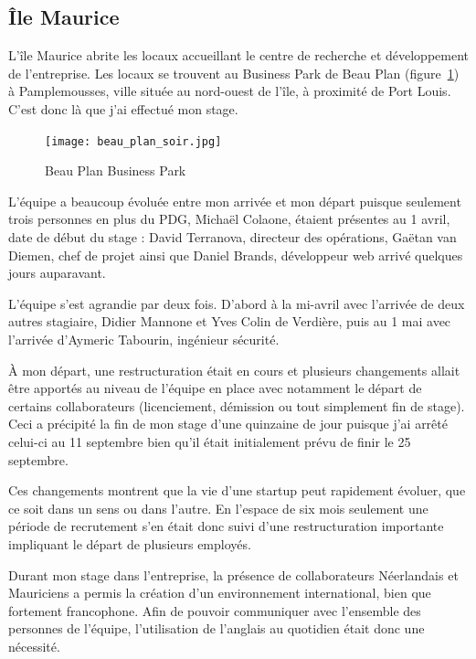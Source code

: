 \documentclass[a4paper,10pt, twoside]{report}
\begin{document}
\begin{spacing}{1.2}
\section{\^Ile Maurice}
L'\^ile Maurice abrite les locaux accueillant le centre de recherche et
d\'eveloppement de l'entreprise. Les locaux se trouvent au Business Park de
Beau Plan (figure~\ref{beauPlan}) \`a Pamplemousses, ville situ\'ee au
nord-ouest de l'\^ile, \`a proximit\'e de Port Louis. C'est donc l\`a que
j'ai effectu\'e mon stage.

\begin{figure}[h!]
  \centering
  \texttt{[image: beau\_plan\_soir.jpg]}
  \caption{\label{beauPlan} Beau Plan Business Park}
\end{figure}

L'\'equipe a beaucoup \'evolu\'ee entre mon arriv\'ee et mon d\'epart puisque
seulement trois personnes en plus du PDG, Micha\"el Colaone, \'etaient
pr\'esentes au 1 avril, date de d\'ebut du stage : David Terranova,
directeur des op\'erations, Ga\"etan van Diemen, chef de projet ainsi que
Daniel Brands, d\'eveloppeur web arriv\'e quelques jours auparavant.

L'\'equipe s'est agrandie par deux fois. D'abord \`a la mi-avril avec
l'arriv\'ee de deux autres stagiaire, Didier Mannone et
Yves Colin de Verdi\`ere, puis au 1 mai avec l'arriv\'ee d'Aymeric
Tabourin, ing\'enieur s\'ecurit\'e.

\`A mon d\'epart, une restructuration \'etait en cours et plusieurs changements
allait \^etre apport\'es au niveau de l'\'equipe en place avec notamment le
d\'epart de certains collaborateurs (licenciement, d\'emission ou tout
simplement fin de stage). Ceci a pr\'ecipit\'e la fin de mon stage d'une
quinzaine de jour puisque j'ai arr\^et\'e celui-ci au 11 septembre bien qu'il
\'etait initialement pr\'evu de finir le 25 septembre.

Ces changements montrent que la vie d'une startup peut rapidement \'evoluer,
que ce soit dans un sens ou dans l'autre. En l'espace de six mois seulement
une p\'eriode de recrutement s'en \'etait donc suivi d'une restructuration
importante impliquant le d\'epart de plusieurs employ\'es.

Durant mon stage dans l'entreprise, la pr\'esence de collaborateurs
N\'eerlandais et Mauriciens a permis la cr\'eation d'un environnement
international, bien que fortement francophone. Afin de pouvoir communiquer avec
l'ensemble des personnes de l'\'equipe, l'utilisation de l'anglais au quotidien
\'etait donc une n\'ecessit\'e.


\end{spacing}
\end{document}
